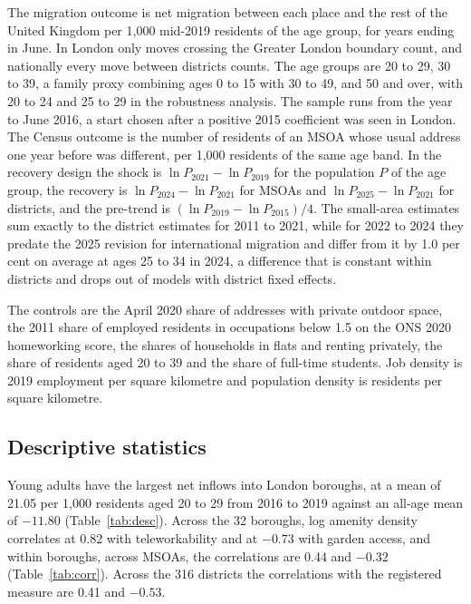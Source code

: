\documentclass[11pt,a4paper]{article}
\begin{document}
The migration outcome is net migration between each place and the rest of the United Kingdom per 1,000 mid-2019 residents of the age group, for years ending in June. In London only moves crossing the Greater London boundary count, and nationally every move between districts counts. The age groups are 20 to 29, 30 to 39, a family proxy combining ages 0 to 15 with 30 to 49, and 50 and over, with 20 to 24 and 25 to 29 in the robustness analysis. The sample runs from the year to June 2016, a start chosen after a positive 2015 coefficient was seen in London. The Census outcome is the number of residents of an MSOA whose usual address one year before was different, per 1,000 residents of the same age band. In the recovery design the shock is $\ln P_{2021} - \ln P_{2019}$ for the population $P$ of the age group, the recovery is $\ln P_{2024} - \ln P_{2021}$ for MSOAs and $\ln P_{2025} - \ln P_{2021}$ for districts, and the pre-trend is $(\ln P_{2019} - \ln P_{2015})/4$. The small-area estimates sum exactly to the district estimates for 2011 to 2021, while for 2022 to 2024 they predate the 2025 revision for international migration and differ from it by 1.0 per cent on average at ages 25 to 34 in 2024, a difference that is constant within districts and drops out of models with district fixed effects.

The controls are the April 2020 share of addresses with private outdoor space, the 2011 share of employed residents in occupations below 1.5 on the ONS 2020 homeworking score, the shares of households in flats and renting privately, the share of residents aged 20 to 39 and the share of full-time students. Job density is 2019 employment per square kilometre and population density is residents per square kilometre.

\subsection{Descriptive statistics}

Young adults have the largest net inflows into London boroughs, at a mean of 21.05 per 1,000 residents aged 20 to 29 from 2016 to 2019 against an all-age mean of $-11.80$ (Table~\ref{tab:desc}). Across the 32 boroughs, log amenity density correlates at 0.82 with teleworkability and at $-0.73$ with garden access, and within boroughs, across MSOAs, the correlations are 0.44 and $-0.32$ (Table~\ref{tab:corr}). Across the 316 districts the correlations with the registered measure are 0.41 and $-0.53$.
\end{document}
